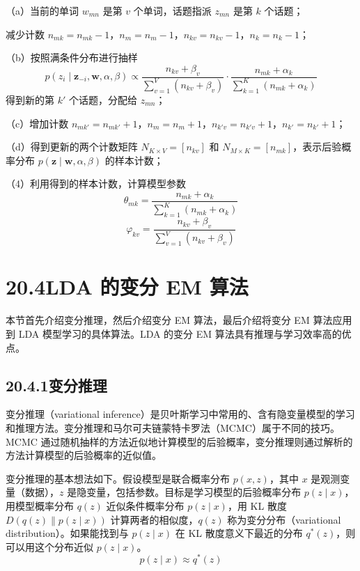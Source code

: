 \documentclass[UTF8,12pt,a4paper,fontset=fandol]{ctexart}
\begin{document}
\quad （a）当前的单词 $w_{mn}$ 是第 $v$ 个单词，话题指派 $z_{mn}$ 是第 $k$ 个话题；

\quad 减少计数 $n_{mk}=n_{mk}-1$，$n_m=n_m-1$，$n_{kv}=n_{kv}-1$，$n_k=n_k-1$；

\quad （b）按照满条件分布进行抽样
\[
p(z_i\mid\mathbf{z}_{-i},\mathbf{w},\alpha,\beta)\propto \frac{n_{kv}+\beta_v}{\sum_{v=1}^V(n_{kv}+\beta_v)}\cdot \frac{n_{mk}+\alpha_k}{\sum_{k=1}^K(n_{mk}+\alpha_k)}
\]
\quad 得到新的第 $k'$ 个话题，分配给 $z_{mn}$；

\quad （c）增加计数 $n_{mk'}=n_{mk'}+1$，$n_m=n_m+1$，$n_{k'v}=n_{k'v}+1$，$n_{k'}=n_{k'}+1$；

\quad （d）得到更新的两个计数矩阵 $N_{K\times V}=[n_{kv}]$ 和 $N_{M\times K}=[n_{mk}]$，表示后验概率分布 $p(\mathbf{z}\mid\mathbf{w},\alpha,\beta)$ 的样本计数；

（4）利用得到的样本计数，计算模型参数
\[
\theta_{mk}=\frac{n_{mk}+\alpha_k}{\sum_{k=1}^K(n_{mk}+\alpha_k)}
\]
\[
\varphi_{kv}=\frac{n_{kv}+\beta_v}{\sum_{v=1}^V(n_{kv}+\beta_v)}
\]

\section*{20.4\quad LDA 的变分 EM 算法}

本节首先介绍变分推理，然后介绍变分 EM 算法，最后介绍将变分 EM 算法应用到 LDA 模型学习的具体算法。LDA 的变分 EM 算法具有推理与学习效率高的优点。

\subsection*{20.4.1\quad 变分推理}

变分推理（variational inference）是贝叶斯学习中常用的、含有隐变量模型的学习和推理方法。变分推理和马尔可夫链蒙特卡罗法（MCMC）属于不同的技巧。MCMC 通过随机抽样的方法近似地计算模型的后验概率，变分推理则通过解析的方法计算模型的后验概率的近似值。

变分推理的基本想法如下。假设模型是联合概率分布 $p(x,z)$，其中 $x$ 是观测变量（数据），$z$ 是隐变量，包括参数。目标是学习模型的后验概率分布 $p(z\mid x)$，用模型概率分布 $q(z)$ 近似条件概率分布 $p(z\mid x)$，用 KL 散度 $D(q(z)\|p(z\mid x))$ 计算两者的相似度，$q(z)$ 称为变分分布（variational distribution）。如果能找到与 $p(z\mid x)$ 在 KL 散度意义下最近的分布 $q^*(z)$，则可以用这个分布近似 $p(z\mid x)$。
\begin{equation}
p(z\mid x)\approx q^*(z)
\tag{20.34}
\end{equation}
\end{document}
